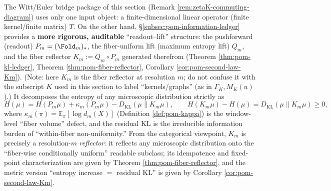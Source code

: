 \begin{remark}\label{rem:reflected-witt-euler-bridge}
The Witt/Euler bridge package of this section (Remark \ref{rem:zetaK-commuting-diagram}) uses only one input object: a finite-dimensional linear operator (finite kernel/finite matrix) \(T\).
On the other hand, \S\ref{subsec:pom-information-ledger} provides a \textbf{more rigorous, auditable} ``readout--lift'' structure:
the pushforward (readout) \(P_m=(\Fold_m)_*\), the fiber-uniform lift (maximum entropy lift) \(Q_m\), and the fiber reflector \(K_m:=Q_m\circ P_m\) generated therefrom
(Theorem \ref{thm:pom-kl-ledger}, Theorem \ref{thm:pom-fiber-reflector}, Corollary \ref{cor:pom-second-law-Km}).
(Note: here \(K_m\) is the fiber reflector at resolution \(m\); do not confuse it with the subscript \(K\) used in this section to label ``kernels/graphs'' (as in \(\Gamma_K,M_K(u)\)).)
It decomposes the entropy of any microscopic distribution strictly as
\[
H(\mu)=H(P_m\mu)+\kappa_m(P_m\mu)-D_{\mathrm{KL}}(\mu\|K_m\mu),
\qquad
H(K_m\mu)-H(\mu)=D_{\mathrm{KL}}(\mu\|K_m\mu)\ge 0,
\]
where \(\kappa_m(\pi)=\mathbb{E}_{\pi}[\log d_m(X)]\) (Definition \ref{def:pom-kappa}) is the window-level ``fiber volume'' defect, and the residual KL is the irreducible information burden of ``within-fiber non-uniformity.''
From the categorical viewpoint, \(K_m\) is precisely a resolution-\(m\) \emph{reflector}: it reflects any microscopic distribution onto the ``fiber-wise conditionally uniform'' readable subclass;
its idempotence and fixed-point characterization are given by Theorem \ref{thm:pom-fiber-reflector}, and the metric version ``entropy increase \(=\) residual KL'' is given by Corollary \ref{cor:pom-second-law-Km}.


\end{remark}
